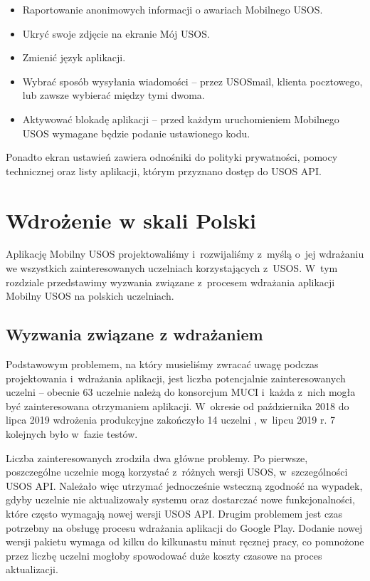 \documentclass{pracamgr}
\begin{document}
\begin{itemize}
	\item Raportowanie anonimowych informacji o awariach Mobilnego USOS.
	\item Ukryć swoje zdjęcie na ekranie Mój USOS.
	\item Zmienić język aplikacji.
	\item Wybrać sposób wysyłania wiadomości -- przez USOSmail, klienta pocztowego,
	lub zawsze wybierać między tymi dwoma.
	\item Aktywować blokadę aplikacji -- przed każdym uruchomieniem Mobilnego USOS
	wymagane będzie podanie ustawionego kodu.
\end{itemize}

Ponadto ekran ustawień zawiera odnośniki do polityki prywatności, pomocy technicznej
oraz listy aplikacji, którym przyznano dostęp do USOS API.

\chapter{Wdrożenie w skali Polski}

Aplikację Mobilny USOS projektowaliśmy i~rozwijaliśmy z~myślą o~jej wdrażaniu we wszystkich zainteresowanych uczelniach
korzystających z~USOS. W~tym rozdziale przedstawimy wyzwania związane z~procesem wdrażania aplikacji Mobilny USOS na
polskich uczelniach.

\section{Wyzwania związane z wdrażaniem}

Podstawowym problemem, na który musieliśmy zwracać uwagę podczas projektowania i~wdrażania aplikacji, jest liczba
potencjalnie zainteresowanych uczelni -- obecnie 63 uczelnie należą do konsorcjum MUCI \cite{uczelnie-w-muci} i~każda
z~nich mogła być zainteresowana otrzymaniem aplikacji. W~okresie od października 2018 do lipca 2019 wdrożenia
produkcyjne zakończyło 14 uczelni \cite{news-musosumk, news-musospwste}, w~lipcu 2019 r. 7 kolejnych było w~fazie testów.

Liczba zainteresowanych zrodziła dwa główne problemy. Po pierwsze, poszczególne uczelnie mogą korzystać z~różnych
wersji USOS, w~szczególności USOS API. Należało więc utrzymać jednocześnie wsteczną zgodność na wypadek, gdyby uczelnie
nie aktualizowały systemu oraz dostarczać nowe funkcjonalności, które często wymagają nowej wersji USOS API. Drugim
problemem jest czas potrzebny na obsługę procesu wdrażania aplikacji do Google Play. Dodanie nowej wersji pakietu
wymaga od kilku do kilkunastu minut ręcznej pracy, co pomnożone przez liczbę uczelni mogłoby spowodować duże koszty
czasowe na proces aktualizacji.
\end{document}
